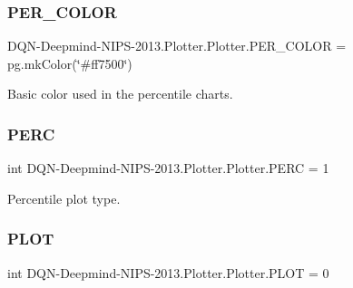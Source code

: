 \subsubsection{\texorpdfstring{P\+E\+R\+\_\+\+C\+O\+L\+OR}{PER\_COLOR}}
{\footnotesize\ttfamily D\+QN-\/Deepmind-\/N\+I\+PS-\/2013.Plotter.\+Plotter.\+P\+E\+R\+\_\+\+C\+O\+L\+OR = pg.\+mk\+Color(\char`\"{}\#ff7500\char`\"{})\hspace{0.3cm}{\ttfamily [static]}}



Basic color used in the percentile charts. 

\hypertarget{classDQN-Deepmind-NIPS-2013_1_1Plotter_1_1Plotter_a1f89ddbef8de94b70bfce1c5c6427b4b}{}\label{classDQN-Deepmind-NIPS-2013_1_1Plotter_1_1Plotter_a1f89ddbef8de94b70bfce1c5c6427b4b} 
\subsubsection{\texorpdfstring{P\+E\+RC}{PERC}}
{\footnotesize\ttfamily int D\+QN-\/Deepmind-\/N\+I\+PS-\/2013.Plotter.\+Plotter.\+P\+E\+RC = 1\hspace{0.3cm}{\ttfamily [static]}}



Percentile plot type. 

\hypertarget{classDQN-Deepmind-NIPS-2013_1_1Plotter_1_1Plotter_a0ed150721300639b6230824109f7427b}{}\label{classDQN-Deepmind-NIPS-2013_1_1Plotter_1_1Plotter_a0ed150721300639b6230824109f7427b} 
\subsubsection{\texorpdfstring{P\+L\+OT}{PLOT}}
{\footnotesize\ttfamily int D\+QN-\/Deepmind-\/N\+I\+PS-\/2013.Plotter.\+Plotter.\+P\+L\+OT = 0\hspace{0.3cm}{\ttfamily [static]}}




